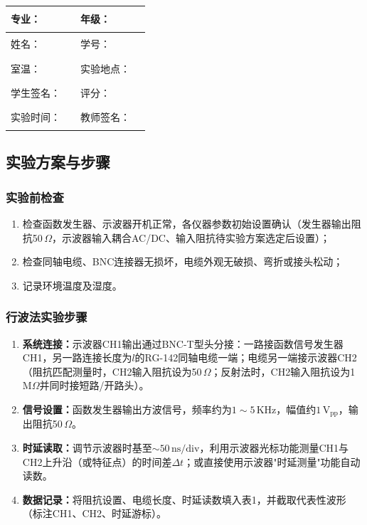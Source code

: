 \documentclass[dvipsnames, svgnames,a4paper,11pt]{article}
\begin{document}
\clearpage
\begin{table}
	\renewcommand\arraystretch{1.7}
	\centering
	\begin{tabularx}{\textwidth}{|X|X|X|X|}
	\hline
	专业：& \rule{2.5cm}{0.4pt} & 年级：& \rule{2.5cm}{0.4pt} \\
	\hline
	姓名：& \rule{2.5cm}{0.4pt} & 学号：& \rule{3cm}{0.4pt} \\
	\hline
	室温：& \rule{2.5cm}{0.4pt} & 实验地点：& \rule{2.5cm}{0.4pt} \\
	\hline
	学生签名：&\rule{2.5cm}{0.4pt} & 评分：& \\
	\hline
	实验时间：& \rule{3cm}{0.4pt} & 教师签名：& \rule{3cm}{0.4pt} \\
	\hline
	\end{tabularx}
\end{table}


\subsection{实验方案与步骤}

\subsubsection{实验前检查}
\begin{enumerate}
	\item 检查函数发生器、示波器开机正常，各仪器参数初始设置确认（发生器输出阻抗50\,$\Omega$，示波器输入耦合AC/DC、输入阻抗待实验方案选定后设置）；
	\item 检查同轴电缆、BNC连接器无损坏，电缆外观无破损、弯折或接头松动；
	\item 记录环境温度及湿度。
\end{enumerate}

\subsubsection{行波法实验步骤}
\begin{enumerate}
	\item \textbf{系统连接：}示波器CH1输出通过BNC-T型头分接：一路接函数信号发生器CH1，另一路连接长度为$l$的RG-142同轴电缆一端；电缆另一端接示波器CH2（阻抗匹配测量时，CH2输入阻抗设为50\,$\Omega$；反射法时，CH2输入阻抗设为1\,M$\Omega$并同时接短路/开路头）。
	\item \textbf{信号设置：}函数发生器输出方波信号，频率约为$1\sim5\,\mathrm{KHz}$，幅值约$1\,\mathrm{V_{pp}}$，输出阻抗50\,$\Omega$。
	\item \textbf{时延读取：}调节示波器时基至$\sim50\,\mathrm{ns/div}$，利用示波器光标功能测量CH1与CH2上升沿（或特征点）的时间差$\Delta t$；或直接使用示波器"时延测量"功能自动读数。
	\item \textbf{数据记录：}将阻抗设置、电缆长度、时延读数填入表1，并截取代表性波形（标注CH1、CH2、时延游标）。
\end{enumerate}
\end{document}
